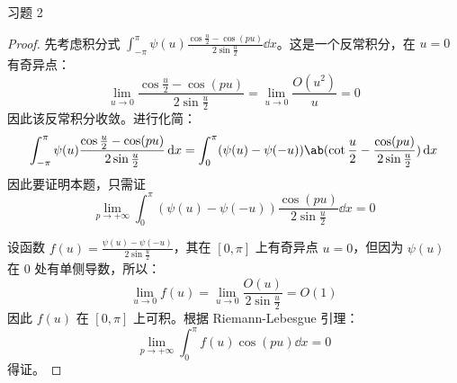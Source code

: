 \begin{problem}
    习题 2
    \begin{proof}
        先考虑积分式 $\int_{-\pi}^{\pi} \psi(u) \frac{\cos \frac{u}{2} - \cos (pu)}{2 \sin \frac{u}{2}} \dd{x}$。这是一个反常积分，在 $u = 0$ 有奇异点：
        $$
        \lim_{u \to 0} \frac{\cos \frac{u}{2} - \cos (p u)}{2 \sin \frac{u}{2}} = \lim_{u \to 0} \frac{O(u^{2})}{u} = 0
        $$
        因此该反常积分收敛。进行化简：
        $$
        \int_{-\pi}^{\pi} \psi(u) \frac{\cos \frac{u}{2} - \cos (pu)}{2 \sin \frac{u}{2}} \dd{x} = \int_0^{\pi} (\psi(u) - \psi(-u)) \ab(\cot \frac{u}{2} - \frac{\cos (pu)}{2 \sin \frac{u}{2}}) \dd{x}
        $$
        因此要证明本题，只需证
        $$
        \lim_{p \to + \infty} \int_{0}^{\pi} (\psi(u) - \psi(-u)) \frac{\cos (p u)}{2 \sin \frac{u}{2}} \dd{x} = 0
        $$

        设函数 $f(u) = \frac{\psi(u) - \psi(-u)}{2 \sin \frac{u}{2}}$，其在 $[0, \pi]$ 上有奇异点 $u = 0$，但因为 $\psi(u)$ 在 $0$ 处有单侧导数，所以：
        $$
        \lim_{u \to 0} f(u) = \lim_{u \to 0} \frac{O(u)}{2 \sin \frac{u}{2}} = O(1)
        $$
        因此 $f(u)$ 在 $[0, \pi]$ 上可积。根据 Riemann-Lebesgue 引理：
        $$
        \lim_{p \to + \infty} \int_{0}^{\pi} f(u) \cos (p u) \dd{x} = 0
        $$
        得证。
    \end{proof}
\end{problem}

